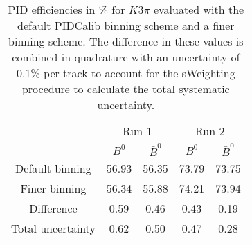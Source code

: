 \begin{table}
    \centering
    \begin{tabular}{ccccc}
    \toprule
& \multicolumn{2}{c}{Run 1} & \multicolumn{2}{c}{Run 2}\\
& $B^0$ & $\bar{B}^0$ & $B^0$ & $\bar{B}^0$\\
    \midrule
Default binning & 56.93 & 56.35 & 73.79 & 73.75\\
Finer binning & 56.34 & 55.88 & 74.21 & 73.94\\
Difference & 0.59 & 0.46 & 0.43 & 0.19\\
Total uncertainty & 0.62 & 0.50 & 0.47 & 0.28\\
    \bottomrule
    \end{tabular}
    \caption{PID efficiencies in \% for $K3\pi$ evaluated with the default PIDCalib binning scheme and a finer binning scheme. The difference in these values is combined in quadrature with an uncertainty of 0.1\% per track to account for the sWeighting procedure to calculate the total systematic uncertainty.}
\label{tab:final_PID_Kpipipi}
\end{table}
